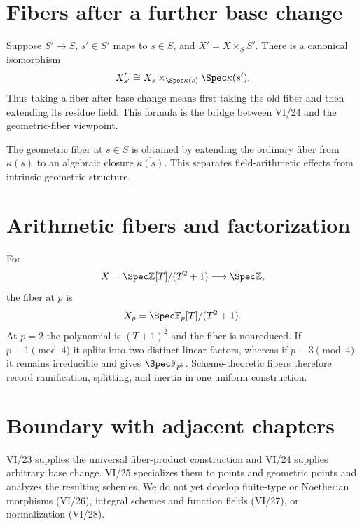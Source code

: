 

\section{Fibers after a further base change}
Suppose $S'\to S$, $s'\in S'$ maps to $s\in S$, and $X'=X\times_SS'$.  There is a canonical
isomorphism
\[
X'_{s'}\cong X_s\times_{\Spec\kappa(s)}\Spec\kappa(s').
\]
Thus taking a fiber after base change means first taking the old fiber and then extending its residue
field.  This formula is the bridge between VI/24 and the geometric-fiber viewpoint.



\begin{example}\label{ex:vi25-expand-03}
The geometric fiber at $s\in S$ is obtained by extending the ordinary fiber from $\kappa(s)$ to an algebraic closure $\overline{\kappa(s)}$.  This separates field-arithmetic effects from intrinsic geometric structure.
\end{example}
\section{Arithmetic fibers and factorization}
For
\[
X=\Spec\mathbb Z[T]/(T^2+1)\longrightarrow\Spec\mathbb Z,
\]
the fiber at $p$ is
\[
X_p=\Spec\mathbb F_p[T]/(T^2+1).
\]
At $p=2$ the polynomial is $(T+1)^2$ and the fiber is nonreduced.  If $p\equiv1\pmod4$ it splits into
two distinct linear factors, whereas if $p\equiv3\pmod4$ it remains irreducible and gives
$\Spec\mathbb F_{p^2}$.  Scheme-theoretic fibers therefore record ramification, splitting, and inertia
in one uniform construction.



\section{Boundary with adjacent chapters}
VI/23 supplies the universal fiber-product construction and VI/24 supplies arbitrary base change.
VI/25 specializes them to points and geometric points and analyzes the resulting schemes.  We do not
yet develop finite-type or Noetherian morphisms (VI/26), integral schemes and function fields (VI/27),
or normalization (VI/28).

